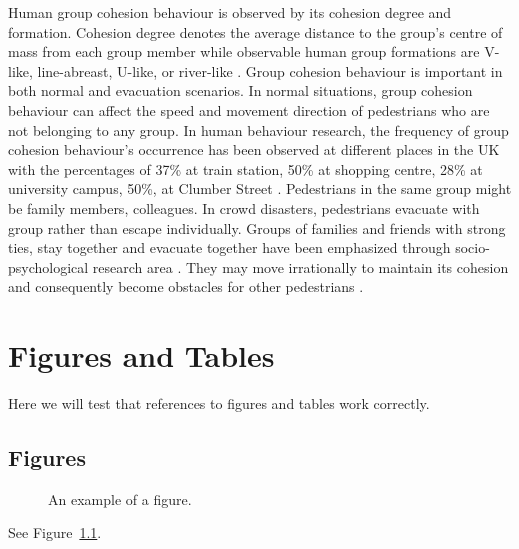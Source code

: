 \documentclass[a4paper,11pt,phdthesis,singlespace,twoside]{cssethesis}
\begin{document}
Human group cohesion behaviour is observed by its cohesion degree and formation. Cohesion degree denotes the average distance to the group’s centre of mass from each group member while observable human group formations are V-like, line-abreast, U-like, or river-like \cite {Helbing2005}. Group cohesion behaviour is important in both normal and evacuation scenarios. In normal situations, group cohesion behaviour can affect the speed and movement direction of pedestrians who are not belonging to any group. In human behaviour research, the frequency of group cohesion behaviour’s occurrence has been observed at different places in the UK with the percentages of 37\% at train station, 50\% at shopping centre, 28\% at university campus, 50\%, at Clumber Street \cite{Singh2009}. Pedestrians in the same group might be family members, colleagues. In crowd disasters, pedestrians evacuate with group rather than escape individually. Groups of families and friends with strong ties, stay together and evacuate together have been emphasized through socio-psychological research area \cite {Mawson2005}. They may move irrationally to maintain its cohesion and consequently become obstacles for other pedestrians \cite{Aguirre2011}.


\chapter{Figures and Tables}
Here we will test that references to figures and tables work correctly.

\section{Figures}
\begin{figure}[ht]
\begin{center}
\end{center}
\caption{An example of a figure.}
\label{fig:example}
\end{figure}
See Figure~\ref{fig:example}.
\end{document}
